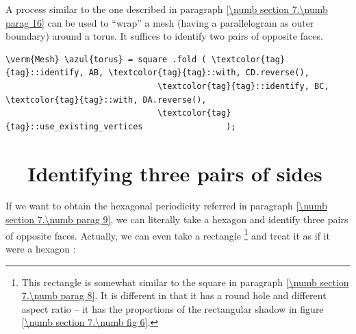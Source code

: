 A process similar to the one described in paragraph \ref{\numb section 7.\numb parag 16}
can be used to ``wrap'' a mesh (having a parallelogram as outer boundary) around
a torus.
It suffices to identify two pairs of opposite faces.

\begin{Verbatim}[commandchars=\\\{\},formatcom=\small\tt,frame=single,
   label=parag-\ref{\numb section 7.\numb parag 17}.cpp,rulecolor=\color{coment},
   baselinestretch=0.94,framesep=2mm                                             ]
   \verm{Mesh} \azul{torus} = square .fold ( \textcolor{tag}{tag}::identify, AB, \textcolor{tag}{tag}::with, CD.reverse(),
                               \textcolor{tag}{tag}::identify, BC, \textcolor{tag}{tag}::with, DA.reverse(),
                               \textcolor{tag}{tag}::use_existing_vertices                 );
\end{Verbatim}


\section{~~Identifying three pairs of sides}\label{\numb section 7.\numb parag 18}

If we want to obtain the hexagonal periodicity referred in paragraph
\ref{\numb section 7.\numb parag 9}, we can literally take a hexagon and
identify three pairs of opposite faces.
Actually, we can even take a rectangle%
\footnote{This rectangle is somewhat similar to the square in paragraph
\ref{\numb section 7.\numb parag 8}.
It is different in that it has a round hole and different aspect ratio --
it has the proportions of the rectangular shadow in figure \ref{\numb section 7.\numb fig 6}.}
and treat it as if it were a hexagon :

